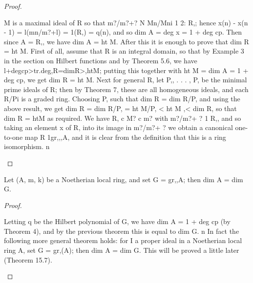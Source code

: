 \begin{proof}
\begin{mathematicalrecord}
M is a maximal        ideal of R so that
            m?/m?+?     N Mn/Mni     1 2: R,;
hence x(n) - x(n - 1) = l(mn/m?+l) = 1(R,) = q(n), and so dim A = deg x = 1 +
deg cp. Then since A = R,, we have dim A = ht M. After this it is enough
to prove that dim R = ht M. First of all, assume that R is an integral
domain, so that by Example 3 in the section on Hilbert functions and by
Theorem 5.6, we have
          l+degcp>tr.deg,R=dimR>,htM;
putting this together with ht M = dim A = 1 + deg cp, we get dim R = ht M.
Next for general R, let P,, . . . , P, be the minimal prime ideals of R; then by
Theorem 7, these are all homogeneous ideals, and each R/Pi is a graded
ring. Choosing P, such that dim R = dim R/P, and using the above result,
we get
         dim R = dim R/P, = ht M/P, < ht M ,< dim R,
so that dim R = htM as required. We have R, c M? c m? with m?/m?+ ? 1
R,, and so taking an element x of R, into its image in m?/m?+ ? we obtain
a canonical one-to-one map R 1gr,,,A,    and it is clear from the definition
that this is a ring isomorphism.  n
\end{mathematicalrecord}
\end{proof}


\begin{theorem}[Theorem 13.9]\label{mcrt-auto-theorem-13-9}
\begin{mathematicalrecord}
Let (A, m, k) be a Noetherian local ring, and set G = gr,,A;
then dim A = dim G.
\end{mathematicalrecord}
\end{theorem}
\begin{proof}
\begin{mathematicalrecord}
Letting q be the Hilbert polynomial         of G, we have dim A =
 1 + deg cp (by Theorem 4), and by the previous theorem this is equal to
dim G. n
    In fact the following more general theorem holds: for I a proper ideal in a
Noetherian local ring A, set G = gr,(A); then dim A = dim G. This will be
proved a little later (Theorem 15.7).
\end{mathematicalrecord}
\end{proof}


